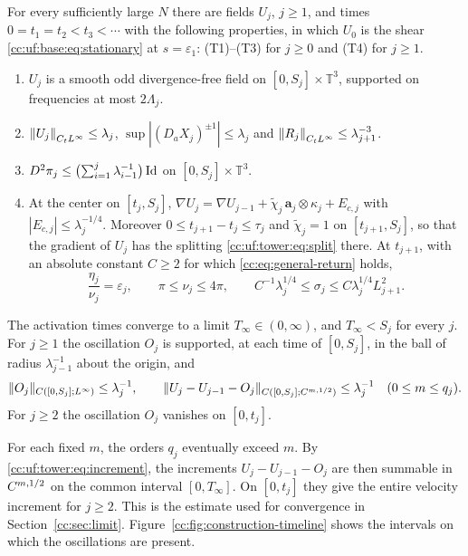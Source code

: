 \begin{theorem}\label{cc:uf:tower:thm:finite}
For every sufficiently large $N$ there are fields $U_j$, $j\ge1$, and
times $0=t_1=t_2<t_3<\cdots$ with the following properties, in which
$U_0$ is the shear \eqref{cc:uf:base:eq:stationary} at $s=\varepsilon_1$:
\textup{(T1)}--\textup{(T3)} for $j\ge0$ and \textup{(T4)} for $j\ge1$.
\begin{enumerate}[label=(T\arabic*),leftmargin=*]
\item $U_j$ is a smooth odd divergence-free field on
$[0,S_j]\times\mathbb T^3$, supported on frequencies at most $2\Lambda_j$.
\item $\left\lVert U_j\right\rVert_{C_tL^\infty}\le\lambda_j$,
$\sup|(D_aX_j)^{\pm1}|\le\lambda_j$ and
$\left\lVert R_j\right\rVert_{C_tL^\infty}\le\lambda_{j+1}^{-3}$.
\item $D^2\pi_j\le\bigl(\sum_{i=1}^j\lambda_{i-1}^{-1}\bigr)\operatorname{Id}$ on
$[0,S_j]\times\mathbb T^3$.
\item At the center on $[t_j,S_j]$,
$\nabla U_j=\nabla U_{j-1}
+\widetilde\chi_j\,\mathbf a_j\otimes\kappa_j+E_{c,j}$ with
$|E_{c,j}|\le\lambda_j^{-1/4}$. Moreover
$0\le t_{j+1}-t_j\le\tau_j$ and $\widetilde\chi_j=1$ on
$[t_{j+1},S_j]$, so that the gradient of $U_j$ has the splitting
\eqref{cc:uf:tower:eq:split} there. At $t_{j+1}$, with an absolute
constant $C\ge2$ for which \eqref{cc:eq:general-return} holds,
\begin{equation}\label{cc:uf:tower:eq:late-values}
 \frac{\eta_j}{\nu_j}=\varepsilon_j,\qquad
 \pi\le\nu_j\le4\pi,\qquad
 C^{-1}\lambda_j^{1/4}\le\sigma_j\le C\lambda_j^{1/4}L_{j+1}^2 .
\end{equation}
\end{enumerate}
The activation times converge to a limit
$T_\infty\in(0,\infty)$, and $T_\infty<S_j$ for every $j$. For $j\ge1$
the oscillation $O_j$ is supported, at each time of $[0,S_j]$, in the
ball of radius $\lambda_{j-1}^{-1}$ about the origin, and
\begin{equation}\label{cc:uf:tower:eq:increment}
 \|O_j\|_{C([0,S_j];L^\infty)}\le\lambda_j^{-1},\qquad
 \|U_j-U_{j-1}-O_j\|_{C([0,S_j];C^{m,1/2})}\le\lambda_j^{-1}
 \quad(0\le m\le q_j).
\end{equation}
For $j\ge2$ the oscillation $O_j$ vanishes on $[0,t_j]$.
\end{theorem}

For each fixed $m$, the orders $q_j$ eventually exceed $m$. By
\eqref{cc:uf:tower:eq:increment}, the increments $U_j-U_{j-1}-O_j$
are then summable in $C^{m,1/2}$ on the common interval $[0,T_\infty]$.
On $[0,t_j]$ they give the entire velocity increment for $j\ge2$.
This is the estimate used for convergence in
Section~\ref{cc:sec:limit}. Figure~\ref{cc:fig:construction-timeline}
shows the intervals on which the oscillations are present.

